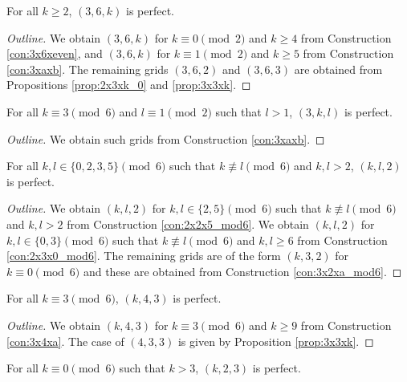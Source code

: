 \begin{prop}
\label{prop:3x6xk}
For all $k \geq 2$, $(3,6,k)$ is perfect.
\end{prop}

\begin{proof}[Outline]
We obtain $(3,6,k)$ for $k \equiv 0 \pmod 2$ and $k \geq 4$ from Construction \ref{con:3x6xeven}, and $(3,6,k)$ for $k \equiv 1 \pmod 2$ and $k \geq 5$ from Construction \ref{con:3xaxb}. The remaining grids $(3,6,2)$ and $(3,6,3)$ are obtained from Propositions \ref{prop:2x3xk_0} and \ref{prop:3x3xk}.
\end{proof}

\begin{prop}
\label{prop:thickness_3_2d_family}
For all $k \equiv 3 \pmod 6$ and $l \equiv 1 \pmod 2$ such that $l >1$, $(3,k,l)$ is perfect.
\end{prop}

\begin{proof}[Outline]
We obtain such grids from Construction \ref{con:3xaxb}.
\end{proof}

\begin{prop}
\label{prop:thickness_2_2d_family}
For all $k,l \in \{0,2,3,5\} \pmod 6$ such that $k \not\equiv l \pmod 6$ and $k,l > 2$, $(k,l,2)$ is perfect.
\end{prop}

\begin{proof}[Outline]
We obtain $(k,l,2)$ for $k,l \in \{2,5\} \pmod 6$ such that $k \not\equiv l \pmod 6$ and $k,l > 2$ from Construction \ref{con:2x2x5_mod6}. We obtain $(k,l,2)$ for $k,l \in \{0,3\} \pmod 6$ such that $k \not\equiv l \pmod 6$ and $k,l \geq 6$ from Construction \ref{con:2x3x0_mod6}. The remaining grids are of the form $(k,3,2)$ for $k \equiv 0 \pmod 6$ and these are obtained from Construction \ref{con:3x2xa_mod6}.
\end{proof}

\begin{prop}
\label{prop:thickness_3_width_4}
For all $k \equiv 3 \pmod 6$, $(k,4,3)$ is perfect.
\end{prop}

\begin{proof}[Outline]
We obtain $(k,4,3)$ for $k \equiv 3 \pmod 6$ and $k \geq 9$ from Construction \ref{con:3x4xa}. The case of $(4,3,3)$ is given by Proposition \ref{prop:3x3xk}.
\end{proof}

\begin{prop}
\label{prop:2x3xk_0}
For all $k \equiv 0 \pmod 6$ such that $k>3$, $(k,2,3)$ is perfect.
\end{prop}

